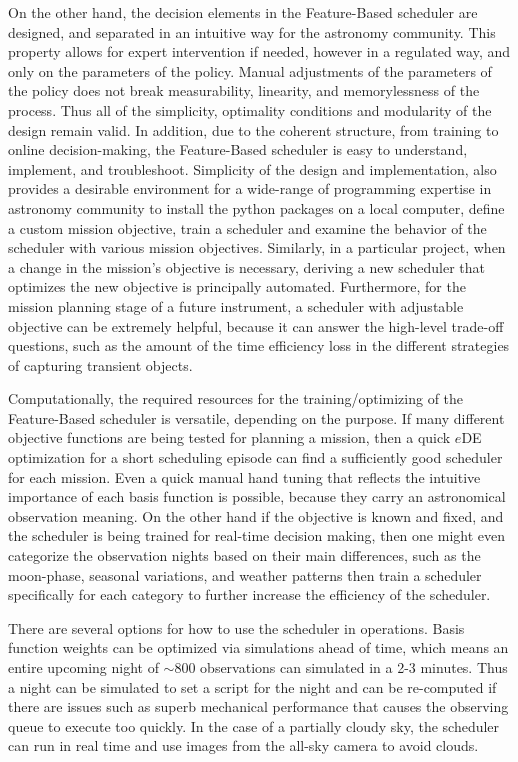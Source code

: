\documentclass[12pt]{aastex62}
\theoremstyle{definition}
\begin{document}
On the other hand, the decision elements in the Feature-Based scheduler are designed, and separated in an intuitive way for the astronomy community. This property allows for expert intervention if needed, however in a regulated way, and only on the parameters of the policy. Manual adjustments of the parameters of the policy does not break measurability, linearity, and memorylessness of the process. Thus all of the simplicity, optimality conditions and modularity of the design remain valid. In addition, due to the coherent structure, from training to online decision-making, the Feature-Based scheduler is easy to understand, implement, and troubleshoot. Simplicity of the design and implementation, also provides a desirable environment for a wide-range of programming expertise in astronomy community to install the python packages on a local computer, define a custom mission objective, train a scheduler and examine the behavior of the scheduler with various mission objectives. Similarly, in a particular project, when a change in the mission's objective is necessary, deriving a new scheduler that optimizes the new objective is principally automated. Furthermore, for the mission planning stage of a future instrument, a scheduler with adjustable objective can be extremely helpful, because it can answer the high-level trade-off questions, such as the amount of the time efficiency loss in the different strategies of capturing transient objects.

Computationally, the required resources for the training/optimizing of the Feature-Based scheduler is versatile, depending on the purpose. If many different objective functions are being tested for planning a mission, then a quick $e$DE optimization for a short scheduling episode can find a sufficiently good scheduler for each mission. Even a quick manual hand tuning that reflects the intuitive importance of each basis function is possible, because they carry an astronomical observation meaning. On the other hand if the objective is known and fixed, and the scheduler is being trained for real-time decision making, then one might even categorize the observation nights based on their main differences, such as the moon-phase, seasonal variations, and weather patterns then train a scheduler specifically for each category to further increase the efficiency of the scheduler. 

There are several options for how to use the scheduler in operations. Basis function weights can be optimized via simulations ahead of time, which means an entire upcoming night of $\sim800$ observations can simulated in a 2-3 minutes. Thus a night can be simulated to set a script for the night and can be re-computed if there are issues such as superb mechanical performance that causes the observing queue to execute too quickly. In the case of a partially cloudy sky, the scheduler can run in real time and use images from the all-sky camera to avoid clouds. 
\end{document}
